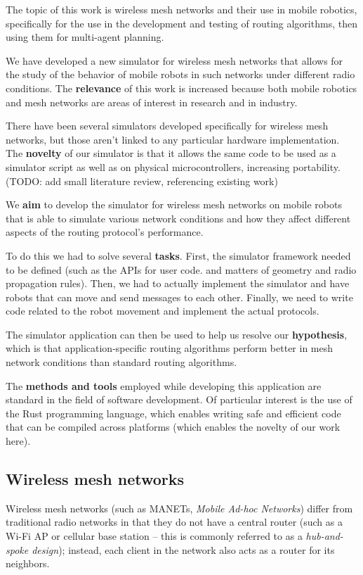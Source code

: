 \documentclass[%
]{article}
\begin{document}
The topic of this work is wireless mesh networks and their use in mobile robotics,
specifically for the use in the development and testing of routing algorithms,
then using them for multi-agent planning.

We have developed a new simulator for wireless mesh networks
that allows for the study of the behavior of mobile robots
in such networks under different radio conditions.
The \textbf{relevance} of this work
is increased because
both mobile robotics and mesh networks
are areas of interest in research and in industry.

There have been several simulators developed
specifically for wireless mesh networks,
but those aren't linked to any particular hardware implementation.
The \textbf{novelty} of our simulator is that
it allows the same code to be used
as a simulator script
as well as on physical microcontrollers,
increasing portability.
(TODO: add small literature review, referencing existing work)

We \textbf{aim} to develop the simulator
for wireless mesh networks on mobile robots
that is able to simulate
various network conditions
and how they affect
different aspects of the routing protocol's performance.

To do this we had to solve several \textbf{tasks}.
First, the simulator framework needed to be defined
(such as the APIs for user code. and matters of geometry and radio propagation rules).
Then, we had to actually implement the simulator and
have robots that can move and send messages to each other.
Finally, we need to write code related to the robot movement
and implement the actual protocols.

The simulator application can then be used
to help us resolve our \textbf{hypothesis},
which is that application-specific routing algorithms
perform better in mesh network conditions
than standard routing algorithms.

The \textbf{methods and tools} employed while developing this application
are standard in the field of software development.
Of particular interest is the use of
the Rust programming language,
which enables writing safe and efficient code
that can be compiled across platforms
(which enables the novelty of our work here).


\subsection{Wireless mesh networks}
Wireless mesh networks (such as MANETs, \emph{Mobile Ad-hoc Networks}) differ from traditional radio networks
in that they do not have a central router (such as a Wi-Fi AP or cellular base station -- this is commonly referred to as a \emph{hub-and-spoke design});
instead, each client in the network also acts as a router for its neighbors.
\end{document}
